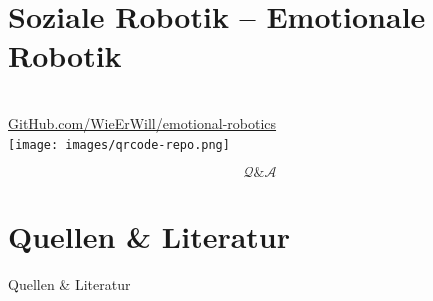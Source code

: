 \documentclass[aspectratio=169]{beamer}
\begin{document}
\section{Soziale Robotik -- Emotionale Robotik}

\begin{frame}[c]{}
    \centering
    \begin{minipage}{\textwidth}
        \centering
        \Large {}\\
        \href{https://github.com/wieerwill/emotional-robotics}{GitHub.com/WieErWill/emotional-robotics}\\
        \vspace{.4cm}
        \texttt{[image: images/qrcode-repo.png]}
    \end{minipage}
\end{frame}

\begin{frame}[c]{}
    \centering
    \begin{minipage}{\textwidth}
        \centering
        \Huge \[\mathcal Q \& \mathcal A\]
        \Large {}
    \end{minipage}
\end{frame}

\section{Quellen \& Literatur}
\begin{frame}[allowframebreaks]{Quellen \& Literatur}
    \scriptsize
    
    
\end{frame}
\end{document}
